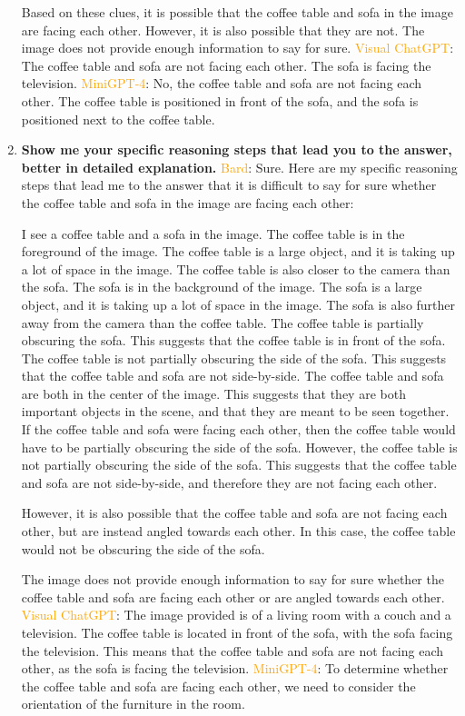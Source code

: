 \begin{enumerate}
    Based on these clues, it is possible that the coffee table and sofa in the image are facing each other. However, it is also possible that they are not. The image does not provide enough information to say for sure.
    \subitem \textcolor{orange}{Visual ChatGPT}: The coffee table and sofa are not facing each other. The sofa is facing the television.
    \subitem \textcolor{orange}{MiniGPT-4}: No, the coffee table and sofa are not facing each other. The coffee table is positioned in front of the sofa, and the sofa is positioned next to the coffee table.
    \item \textbf{Show me your specific reasoning steps that lead you to the answer, better in detailed explanation.}
    \subitem \textcolor{orange}{Bard}: 
    Sure. Here are my specific reasoning steps that lead me to the answer that it is difficult to say for sure whether the coffee table and sofa in the image are facing each other:
    
    I see a coffee table and a sofa in the image.
    The coffee table is in the foreground of the image. The coffee table is a large object, and it is taking up a lot of space in the image. The coffee table is also closer to the camera than the sofa.
    The sofa is in the background of the image. The sofa is a large object, and it is taking up a lot of space in the image. The sofa is also further away from the camera than the coffee table.
    The coffee table is partially obscuring the sofa. This suggests that the coffee table is in front of the sofa.
    The coffee table is not partially obscuring the side of the sofa. This suggests that the coffee table and sofa are not side-by-side.
    The coffee table and sofa are both in the center of the image. This suggests that they are both important objects in the scene, and that they are meant to be seen together.
    If the coffee table and sofa were facing each other, then the coffee table would have to be partially obscuring the side of the sofa. However, the coffee table is not partially obscuring the side of the sofa. This suggests that the coffee table and sofa are not side-by-side, and therefore they are not facing each other.
    
    However, it is also possible that the coffee table and sofa are not facing each other, but are instead angled towards each other. In this case, the coffee table would not be obscuring the side of the sofa.
    
    The image does not provide enough information to say for sure whether the coffee table and sofa are facing each other or are angled towards each other.
    \subitem \textcolor{orange}{Visual ChatGPT}: The image provided is of a living room with a couch and a television. The coffee table is located in front of the sofa, with the sofa facing the television. This means that the coffee table and sofa are not facing each other, as the sofa is facing the television.
    \subitem \textcolor{orange}{MiniGPT-4}: To determine whether the coffee table and sofa are facing each other, we need to consider the orientation of the furniture in the room.


\end{enumerate}
